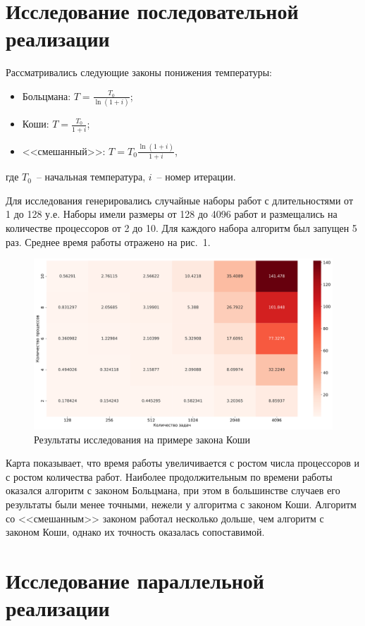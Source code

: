 \documentclass[12pt]{article}
\begin{document}
\section{Исследование последовательной реализации}

Рассматривались следующие законы понижения температуры:
\begin{itemize}
    \item Больцмана: $T = \frac{T_0}{\ln(1+i)}$;
    \item Коши: $T = \frac{T_0}{1+i}$;
    \item <<смешанный>>: $T = T_0\frac{\ln(1+i)}{1+i}$,
\end{itemize}
где $T_0$~-- начальная температура, $i$~-- номер итерации.

Для исследования генерировались случайные наборы работ с длительностями
от 1 до 128 у.е. Наборы имели размеры от 128 до 4096 работ и размещались на
количестве процессоров от 2 до 10. Для каждого набора алгоритм был запущен
5 раз. Среднее время работы отражено на рис.~1.

\begin{figure}[!h]
    \includegraphics[width=\textwidth,keepaspectratio]{heatmap.png}
    \caption{Результаты исследования на примере закона Коши}
\end{figure}

Карта показывает, что время работы увеличивается с ростом числа процессоров
и с ростом количества работ. Наиболее продолжительным по времени работы
оказался алгоритм с законом Больцмана, при этом в большинстве случаев его
результаты были менее точными, нежели у алгоритма с законом Коши.
Алгоритм со <<смешанным>> законом работал несколько дольше, чем алгоритм
с законом Коши, однако их точность оказалась сопоставимой.

\section{Исследование параллельной реализации}
\end{document}
